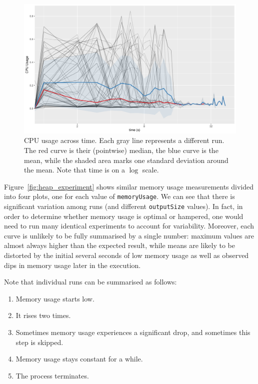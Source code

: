 \documentclass{article}
\begin{document}
\begin{figure}
  \centering
  \includegraphics[width=\textwidth]{../plots/cpu_experiment.png}
  \caption{CPU usage across time. Each gray line represents a different run. The
  red curve is their (pointwise) median, the blue curve is the mean, while the
  shaded area marks one standard deviation around the mean. Note that time is on a
  $\log$ scale.}
  \label{fig:cpu_experiment}
\end{figure}

Figure~\ref{fig:heap_experiment} shows similar memory usage measurements divided
into four plots, one for each value of \texttt{memoryUsage}. We can see that
there is significant variation among runs (and different \texttt{outputSize}
values). In fact, in order to determine whether memory usage is optimal or
hampered, one would need to run many identical experiments to account for
variability. Moreover, each curve is unlikely to be fully summarised by a single
number: maximum values are almost always higher than the expected result, while
means are likely to be distorted by the initial several seconds of low memory
usage as well as observed dips in memory usage later in the execution.

Note that individual runs can be summarised as follows:
\begin{enumerate}
\item Memory usage starts low.
\item It rises two times.
\item Sometimes memory usage experiences a significant drop, and sometimes this
  step is skipped.
\item Memory usage stays constant for a while.
\item The process terminates.
\end{enumerate}
\end{document}
